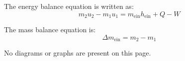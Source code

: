 The energy balance equation is written as:  
\[
m_2 u_2 - m_1 u_1 = m_{\text{ein}} h_{\text{ein}} + Q - W
\]  

The mass balance equation is:  
\[
\Delta m_{\text{ein}} = m_2 - m_1
\]  

No diagrams or graphs are present on this page.